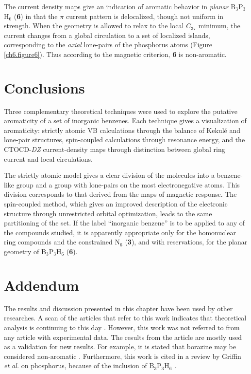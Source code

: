 The current density maps give an indication of aromatic behavior
in \textit{planar} B$_3$P$_3$H$_6$ (\textbf{6}) in that the $\pi$ current pattern is delocalized,
though not uniform in strength. When the geometry is allowed to relax to the local $C_{\mathrm{3v}}$
minimum, the current changes from a global circulation to a
set of localized islands, corresponding to the \textit{axial} lone-pairs of the phosphorus atoms
(Figure \ref{ch6.figure6}). Thus according to the magnetic criterion, \textbf{6} is non-aromatic.

\section{Conclusions}

Three complementary theoretical techniques were used to explore the putative
aromaticity of a set of inorganic benzenes. Each technique gives a visualization
of aromaticity: strictly atomic VB calculations through the balance of Kekul\'e and
lone-pair structures, spin-coupled calculations through resonance energy, and the CTOCD-\textit{DZ}
current-density maps through distinction between global ring current and local circulations.

The strictly atomic model gives a clear division of the molecules into a
benzene-like group and a group with lone-pairs on the most electronegative
atoms. This division corresponds to that derived from the maps of magnetic response. The spin-coupled
method, which gives an improved description of the
electronic structure through unrestricted orbital optimization, leads to the same partitioning of the
set. If the label ``inorganic benzene'' is to be applied to any of the compounds studied, it is apparently
appropriate only for the homonuclear ring compounds and the constrained N$_6$ (\textbf{3}), and with
reservations, for the planar geometry of B$_3$P$_3$H$_6$ (\textbf{6}).

\section*{Addendum}
The results and discussion presented in this chapter have been used by other researches. A scan of the articles that refer to this work indicates that theoretical analysis is continuing to this day \cite{ac01,ac02,ac03,ac04,ac05,ac06,ac07,ac08,ac09,ae01}. However, this work was not referred to from any article with experimental data. The results from the article are mostly used as a validation for new results. For example, it is stated that borazine may be considered non-aromatic \cite{ac05,ac07}. Furthermore, this work is cited in a review by Griffin \textit{et al.} on phosphorus, because of the inclusion of B$_3$P$_3$H$_6$ \cite{ae01}.

